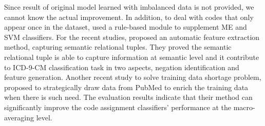 Since result of original model learned with imbalanced data is not provided, we cannot know the actual improvement. In addition, to deal with codes that only appear once in the dataset, \citeauthor{patrick2007developing} \citeyear{patrick2007developing} \cite{patrick2007developing} used a rule-based module to supplement ME and SVM classifiers.
For the recent studies, \citeauthor{zhao2017automatic} \citeyear{zhao2017automatic} \cite{zhao2017automatic} proposed an automatic feature extraction method, capturing semantic relational tuples. They proved the semantic relational tuple is able to capture information at semantic level and it contribute to ICD-9-CM classification task in two aspects, negation identification and feature generation. Another recent study to solve training data shortage problem, \citeauthor{zhang2017enhancing} \citeyear{zhang2017enhancing} \cite{zhang2017enhancing} proposed to strategically draw data from PubMed to enrich the training data when there is such need. The evaluation results indicate that their method can significantly improve the code assignment classifiers’ performance at the macro-averaging level. 